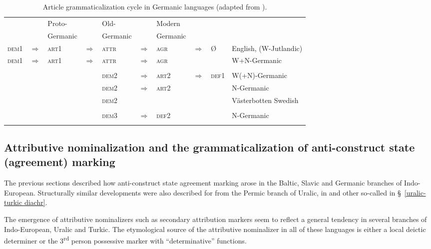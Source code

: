 {
\begin{sidewaystable}
\begin{tabular}[t]{l l l l l l l l l l}
\lsptoprule
&	&Proto\hyp{}& &Old-&	&Modern&&\\
&	&Germanic&	&Germanic&	&Germanic&&\\
\midrule
\textsc{dem1}&$\Rightarrow$&\textsc{art1}&$\Rightarrow$&\textsc{attr}&$\Rightarrow$&\textsc{agr}&$\Rightarrow$&Ø&English, (W-Jutlandic)\\
\textsc{dem1}&$\Rightarrow$&\textsc{art1}&$\Rightarrow$&\textsc{attr}&$\Rightarrow$&\textsc{agr}&&&W+N-Germanic\\
\\
&&&		&\textsc{dem2}&$\Rightarrow$&\textsc{art2}&$\Rightarrow$&\textsc{def1}&W(+N)-Germanic\\
&&&		&\textsc{dem2}&$\Rightarrow$&\textsc{art2}&&&N-Germanic\\
&&&		&\textsc{dem2}&&&&&Västerbotten Swedish\\
\\
&&&		&\textsc{dem3}&$\Rightarrow$&\textsc{def2}&&&N-Germanic\\
\lspbottomrule
\end{tabular}
\caption[Article grammaticalization cycle in Germanic]{Article grammaticalization cycle in Germanic languages (adapted from \citealt[272]{riesler2006a}).}
\end{sidewaystable}

\subsection[Attributive nominalization and anti-construct state]{Attributive nominalization and the grammaticalization of anti-construct state (agreement) marking}
The previous sections described how anti-construct state agreement marking arose in the Baltic, Slavic and Germanic branches of Indo-European. Structurally similar developments were also described for  from the Permic branch of Uralic, in  and other so-called  in \S~\ref{uralic-turkic diachr}. 

The emergence of attributive nominalizers such as secondary attribution markers seem to reflect a general tendency in several branches of Indo-European, Uralic and Turkic. The etymological source of the attributive nominalizer in all of these languages is either a local deictic determiner or the 3\textsuperscript{rd} person possessive marker with “determinative” functions.

}

